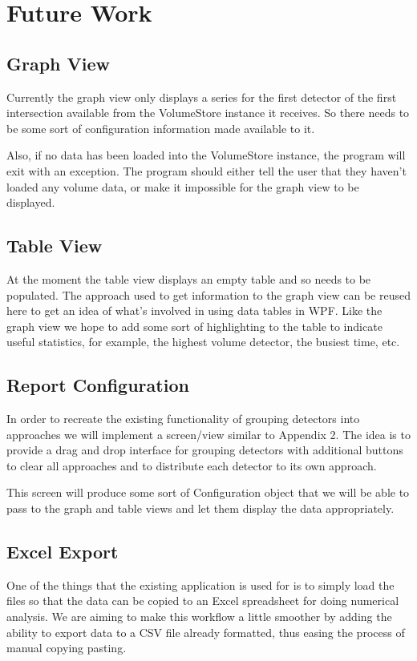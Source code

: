 \documentclass{article}
\begin{document}
\section{Future Work}
\subsection{Graph View}
Currently the graph view only displays a series for the first
detector of the first intersection available from the
VolumeStore instance it receives. So there needs to be some
sort of configuration information made available to it.

Also, if no data has been loaded into the VolumeStore
instance, the program will exit with an exception. The
program should either tell the user that they haven’t loaded
any volume data, or make it impossible for the graph view to
be displayed.

\subsection{Table View}
At the moment the table view displays an empty table and
so needs to be populated. The approach used to get
information to the graph view can be reused here to get an
idea of what’s involved in using data tables in WPF.
Like the graph view we hope to add some sort of
highlighting to the table to indicate useful statistics, for
example, the highest volume detector, the busiest time, etc.

\subsection{Report Configuration}
In order to recreate the existing functionality of grouping
detectors into approaches we will implement a screen/view
similar to Appendix 2. The idea is to provide a drag and drop
interface for grouping detectors with additional buttons to
clear all approaches and to distribute each detector to its own
approach.

This screen will produce some sort of Configuration object
that we will be able to pass to the graph and table views and
let them display the data appropriately.

\subsection{Excel Export}
One of the things that the existing application is used for is
to simply load the files so that the data can be copied to an
Excel spreadsheet for doing numerical analysis. We are
aiming to make this workflow a little smoother by adding the
ability to export data to a CSV file already formatted, thus
easing the process of manual copying pasting.
\end{document}
